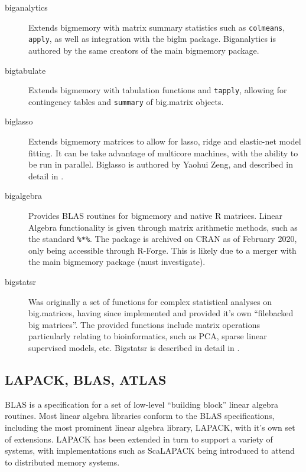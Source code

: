 \documentclass[10pt,a4paper]{article}
\begin{document}
\begin{description}
\item[biganalytics] Extends bigmemory with matrix summary statistics
  such as \texttt{colmeans}, \texttt{apply}, as well as integration
  with the biglm package\cite{emerson16}. Biganalytics is authored by
  the same creators of the main bigmemory package.
\item[bigtabulate] Extends bigmemory with tabulation functions and
  \texttt{tapply}, allowing for contingency tables and
  \texttt{summary} of big.matrix objects\parencite{kane16}.
\item[biglasso] Extends bigmemory matrices to allow for lasso, ridge
  and elastic-net model fitting. It can be take advantage of multicore
  machines, with the ability to be run in parallel. Biglasso is
  authored by Yaohui Zeng, and described in detail in
  \textcite{zeng2017biglasso}.
\item[bigalgebra] Provides BLAS routines for bigmemory and native R
  matrices. Linear Algebra functionality is given through matrix
  arithmetic methods, such as the standard \texttt{\%*\%}. The package
  is archived on CRAN as of February 2020, only being accessible
  through R-Forge. This is likely due to a merger with the main
  bigmemory package (must investigate).
\item[bigstatsr] Was originally a set of functions for complex
  statistical analyses on big.matrices, having since implemented and
  provided it's own ``filebacked big matrices''\cite{prive2018efficient}. The provided
  functions include matrix operations particularly relating to
  bioinformatics, such as PCA, sparse linear supervised models, etc.
  Bigstatsr is described in detail in \textcite{prive2018efficient}.
\end{description}

\subsection{LAPACK, BLAS, ATLAS}
\label{sec:blas-lapack}

BLAS is a specification for a set of low-level ``building block''
linear algebra routines\cite{lawson1979basic}. Most linear algebra
libraries conform to the BLAS specifications, including the most
prominent linear algebra library, LAPACK, with it's own set of
extensions\cite{demmel1989lapack}. LAPACK has been extended in turn to
support a variety of systems, with implementations such as ScaLAPACK
being introduced to attend to distributed memory
systems\cite{choi1992scalapack}.
     
\end{document}
